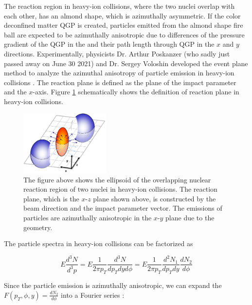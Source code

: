 The reaction region in heavy-ion collisions, where the two nuclei overlap with each other, has an almond shape, which is azimuthally asymmetric. If the color deconfined matter QGP is created, particles emitted from the almond shape fire ball are expected to be azimuthally anisotropic due to differences of the pressure gradient of the QGP in the and their path length through QGP in the $x$ and $y$ directions. Experimentally, physicists Dr. Arthur Poskanzer (who sadly just passed away on June 30 2021) and Dr. Sergey Voloshin developed the event plane method to analyze the azimuthal anisotropy of particle emission in heavy-ion collisions \cite{EllipticFlow}. The reaction plane is defined as the plane of the impact parameter and the $x$-axis. Figure \ref{EventPlane} schematically shows the definition of reaction plane in heavy-ion collisions.

\begin{figure}[hbtp]
\begin{center}
\includegraphics[width=0.40\textwidth]{Figures/Chapter1/ReactionPlane.jpg}
\caption{The figure above shows the ellipsoid of the overlapping nuclear reaction region of two nuclei in heavy-ion collisions. The reaction plane, which is the $x$-$z$ plane shown above, is constructed by the beam direction and the impact parameter vector. The emissions of particles are azimuthally anisotropic in the $x$-$y$ plane due to the geometry.}
\label{EventPlane}
\end{center}
\end{figure} 

The particle spectra in heavy-ion collisions can be factorized as 

\begin{equation}
E \frac{d^3N}{d^3p} = E \frac{1}{2 \pi p_T}\frac{d^3N}{dp_T dy d\phi} = E \frac{1}{2 \pi p_T} \frac{d^2N_1}{dp_T dy} \frac{dN_2}{d\phi}
\end{equation}

Since the particle emission is azimuthally anisotropic, we can expand the $F(p_T,\phi,y) = \frac{dN_2}{d\phi}$ into a Fourier series \cite{EllipticFlow}:


